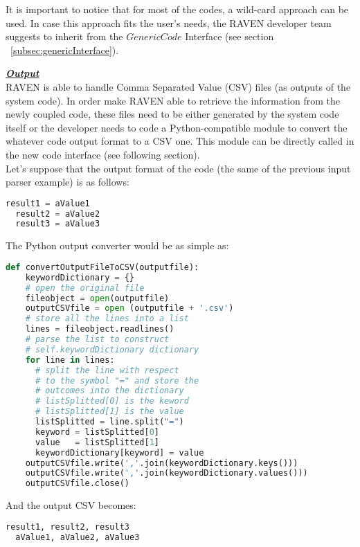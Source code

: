 It is important to notice that for most of the codes, a wild-card approach can be used. In case this approach fits the user's needs,
the RAVEN developer team suggests to inherit from the $GenericCode$ Interface (see section ~\ref{subsec:genericInterface}).

\textbf{\textit{\underline{Output}}}
\newline
\\RAVEN is able to handle Comma Separated Value (CSV) files (as outputs
of the system code). In order make RAVEN able to retrieve the information
 from the newly coupled code, these files need to be  either generated by the
 system code itself or the developer needs to code a Python-compatible
module to convert the whatever code output format to a CSV one.
This module can be  directly called in the new code interface (see following section).
\\ Let's suppose that the output format of the code (the same of the previous
input parser example) is as follows:
\begin{lstlisting}[language=python]
  result1 = aValue1
  result2 = aValue2
  result3 = aValue3
\end{lstlisting}
The Python output converter would be as simple as:
\begin{lstlisting}[language=python]
def convertOutputFileToCSV(outputfile):
    keywordDictionary = {}
    # open the original file
    fileobject = open(outputfile)
    outputCSVfile = open (outputfile + '.csv')
    # store all the lines into a list
    lines = fileobject.readlines()
    # parse the list to construct
    # self.keywordDictionary dictionary
    for line in lines:
      # split the line with respect
      # to the symbol "=" and store the
      # outcomes into the dictionary
      # listSplitted[0] is the keword
      # listSplitted[1] is the value
      listSplitted = line.split("=")
      keyword = listSplitted[0]
      value   = listSplitted[1]
      keywordDictionary[keyword] = value
    outputCSVfile.write(','.join(keywordDictionary.keys()))
    outputCSVfile.write(','.join(keywordDictionary.values()))
    outputCSVfile.close()
\end{lstlisting}
And the output CSV becomes:
\begin{lstlisting}[language=python]
  result1, result2, result3
  aValue1, aValue2, aValue3
\end{lstlisting}
